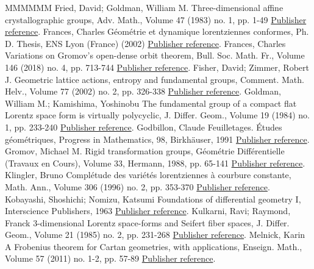 \begin{thebibliography}{MMMMMM}
 Fried, David; Goldman, William M. Three-dimensional affine crystallographic groups, Adv. Math., Volume 47 (1983) no. 1, pp. 1-49 \href{https://ahl.centre-mersenne.org/item/AHL_2020__3__407_0/#fried.goldman}{Publisher reference}.
 Frances, Charles Géométrie et dynamique lorentziennes conformes, Ph. D. Thesis, ENS Lyon (France) (2002) \href{https://ahl.centre-mersenne.org/item/AHL_2020__3__407_0/#charlesthese}{Publisher reference}.
 Frances, Charles Variations on Gromov’s open-dense orbit theorem, Bull. Soc. Math. Fr., Volume 146 (2018) no. 4, pp. 713-744 \href{https://ahl.centre-mersenne.org/item/AHL_2020__3__407_0/#frances.open}{Publisher reference}.
 Fisher, David; Zimmer, Robert J. Geometric lattice actions, entropy and fundamental groups, Comment. Math. Helv., Volume 77 (2002) no. 2, pp. 326-338 \href{https://ahl.centre-mersenne.org/item/AHL_2020__3__407_0/#fisher.zimmer}{Publisher reference}.
 Goldman, William M.; Kamishima, Yoshinobu The fundamental group of a compact flat Lorentz space form is virtually polycyclic, J. Differ. Geom., Volume 19 (1984) no. 1, pp. 233-240 \href{https://ahl.centre-mersenne.org/item/AHL_2020__3__407_0/#goldman.kami}{Publisher reference}.
 Godbillon, Claude Feuilletages. Études géométriques, Progress in Mathematics, 98, Birkhäuser, 1991 \href{https://ahl.centre-mersenne.org/item/AHL_2020__3__407_0/#godbillon}{Publisher reference}.
 Gromov, Michael M. Rigid transformation groups, Géométrie Différentielle (Travaux en Cours), Volume 33, Hermann, 1988, pp. 65-141 \href{https://ahl.centre-mersenne.org/item/AHL_2020__3__407_0/#gromov}{Publisher reference}.
 Klingler, Bruno Complétude des variétés lorentziennes à courbure constante, Math. Ann., Volume 306 (1996) no. 2, pp. 353-370 \href{https://ahl.centre-mersenne.org/item/AHL_2020__3__407_0/#klingler}{Publisher reference}.
 Kobayashi, Shoshichi; Nomizu, Katsumi Foundations of differential geometry I, Interscience Publishers, 1963 \href{https://ahl.centre-mersenne.org/item/AHL_2020__3__407_0/#kobanomi}{Publisher reference}.
 Kulkarni, Ravi; Raymond, Franck 3-dimensional Lorentz space-forms and Seifert fiber spaces, J. Differ. Geom., Volume 21 (1985) no. 2, pp. 231-268 \href{https://ahl.centre-mersenne.org/item/AHL_2020__3__407_0/#kulkarni.raymond}{Publisher reference}.
 Melnick, Karin A Frobenius theorem for Cartan geometries, with applications, Enseign. Math., Volume 57 (2011) no. 1-2, pp. 57-89 \href{https://ahl.centre-mersenne.org/item/AHL_2020__3__407_0/#melnick}{Publisher reference}.

\end{thebibliography}
